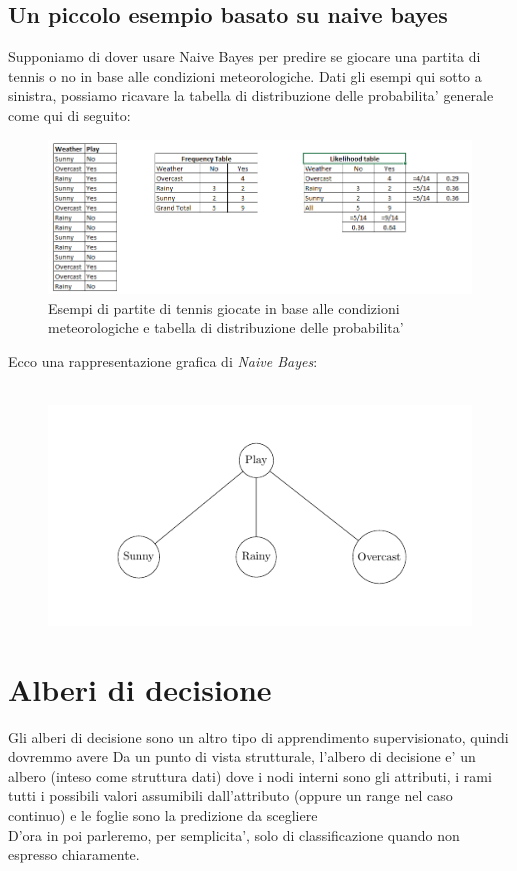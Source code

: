 \subsection{Un piccolo esempio basato su naive bayes}
Supponiamo di dover usare Naive Bayes per predire se giocare una partita di tennis o no in base alle condizioni meteorologiche. Dati gli esempi qui sotto a sinistra, possiamo ricavare la tabella di distribuzione delle probabilita' generale come qui di seguito:
\begin{figure}[H]
	\centering
	\includegraphics[width=1\linewidth]{img/Bayes_tennis_sample}
	\caption{Esempi di partite di tennis giocate in base alle condizioni meteorologiche e tabella di distribuzione delle probabilita'}
	\label{}
\end{figure}
\medskip
Ecco una rappresentazione grafica di \textit{Naive Bayes}:\\\\

\begin{figure}[H]
	\centering
	\includegraphics[width=0.7\linewidth]{img/graph_naive_bayes}
	\caption{}
	\label{fig:graphnaivebayes}
\end{figure}

\section{Alberi di decisione}
Gli alberi di decisione sono un altro tipo di apprendimento supervisionato, quindi dovremmo avere 
Da un punto di vista strutturale, l'albero di decisione e' un albero (inteso come struttura dati) dove i nodi interni sono gli attributi, i rami tutti i possibili valori assumibili dall'attributo (oppure un range nel caso continuo) e le foglie sono la predizione da scegliere\\D'ora in poi parleremo, per semplicita', solo di classificazione quando non espresso chiaramente.

